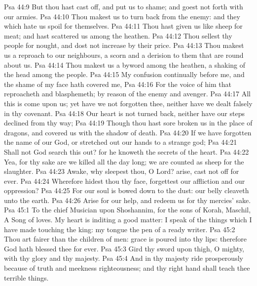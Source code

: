 \vs Psa 44:9 But thou hast cast off, and put us to shame; and goest not forth with our armies.
\vs Psa 44:10 Thou makest us to turn back from the enemy: and they which hate us spoil for themselves.
\vs Psa 44:11 Thou hast given us like sheep  for meat; and hast scattered us among the heathen.
\vs Psa 44:12 Thou sellest thy people for nought, and dost not increase  by their price.
\vs Psa 44:13 Thou makest us a reproach to our neighbours, a scorn and a derision to them that are round about us.
\vs Psa 44:14 Thou makest us a byword among the heathen, a shaking of the head among the people.
\vs Psa 44:15 My confusion  continually before me, and the shame of my face hath covered me,
\vs Psa 44:16 For the voice of him that reproacheth and blasphemeth; by reason of the enemy and avenger.
\vs Psa 44:17 All this is come upon us; yet have we not forgotten thee, neither have we dealt falsely in thy covenant.
\vs Psa 44:18 Our heart is not turned back, neither have our steps declined from thy way;
\vs Psa 44:19 Though thou hast sore broken us in the place of dragons, and covered us with the shadow of death.
\vs Psa 44:20 If we have forgotten the name of our God, or stretched out our hands to a strange god;
\vs Psa 44:21 Shall not God search this out? for he knoweth the secrets of the heart.
\vs Psa 44:22 Yea, for thy sake are we killed all the day long; we are counted as sheep for the slaughter.
\vs Psa 44:23 Awake, why sleepest thou, O Lord? arise, cast  not off for ever.
\vs Psa 44:24 Wherefore hidest thou thy face,  forgettest our affliction and our oppression?
\vs Psa 44:25 For our soul is bowed down to the dust: our belly cleaveth unto the earth.
\vs Psa 44:26 Arise for our help, and redeem us for thy mercies' sake.
\vs Psa 45:1 To the chief Musician upon Shoshannim, for the sons of Korah, Maschil, A Song of loves. My heart is inditing a good matter: I speak of the things which I have made touching the king: my tongue  the pen of a ready writer.
\vs Psa 45:2 Thou art fairer than the children of men: grace is poured into thy lips: therefore God hath blessed thee for ever.
\vs Psa 45:3 Gird thy sword upon  thigh, O  mighty, with thy glory and thy majesty.
\vs Psa 45:4 And in thy majesty ride prosperously because of truth and meekness  righteousness; and thy right hand shall teach thee terrible things.
